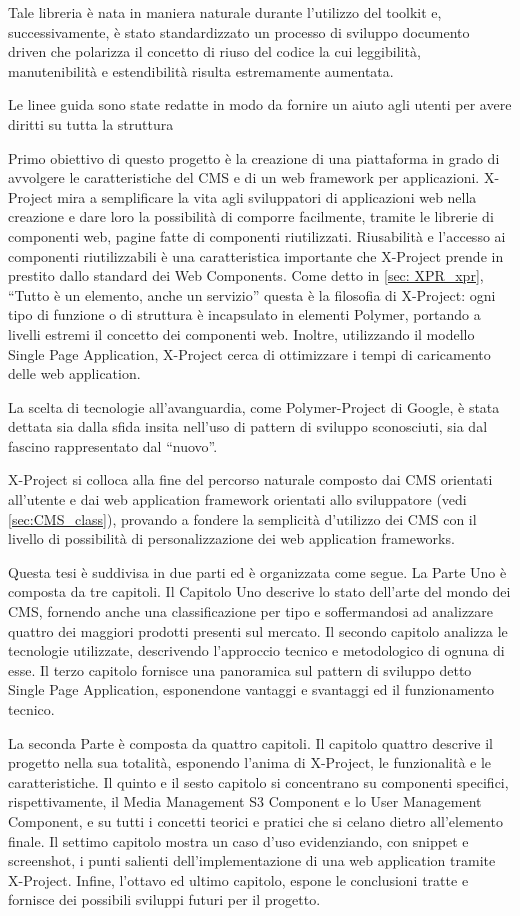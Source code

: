 Tale libreria è nata in maniera naturale durante l'utilizzo del toolkit e, successivamente, è stato standardizzato un processo di sviluppo documento driven che polarizza il concetto di riuso del codice la cui leggibilità, manutenibilità e estendibilità risulta estremamente aumentata.

Le linee guida sono state redatte in modo da fornire un aiuto agli utenti per avere diritti su tutta la struttura

Primo obiettivo di questo progetto è la creazione di una piattaforma in grado di avvolgere le caratteristiche del CMS e di un web framework per applicazioni.
X-Project mira a semplificare la vita agli sviluppatori di applicazioni web nella creazione e dare loro la possibilità di comporre facilmente, tramite le librerie di componenti web, pagine fatte di componenti riutilizzati.
Riusabilità e l'accesso ai componenti riutilizzabili è una caratteristica importante che X-Project prende in prestito dallo standard dei Web Components.
Come detto in \ref{sec: XPR_xpr}, ``Tutto è un elemento, anche un servizio'' questa è la filosofia di X-Project: ogni tipo di funzione o di struttura è incapsulato in elementi Polymer, portando a livelli estremi il concetto dei componenti web.
Inoltre, utilizzando il modello Single Page Application, X-Project cerca di ottimizzare i tempi di caricamento delle web application.

La scelta di tecnologie all'avanguardia, come Polymer-Project di Google, è stata dettata sia dalla sfida insita nell'uso di pattern di sviluppo sconosciuti, sia dal fascino rappresentato dal ``nuovo''. 

X-Project si colloca alla fine del percorso naturale composto dai CMS orientati all'utente e dai web application framework orientati allo sviluppatore (vedi \ref{sec:CMS_class}), provando a fondere la semplicità d'utilizzo dei CMS con il livello di possibilità di personalizzazione dei web application frameworks.

Questa tesi è suddivisa in due parti ed è organizzata come segue. La Parte Uno è composta da tre capitoli. Il Capitolo Uno descrive lo stato dell'arte del mondo dei CMS, fornendo anche una classificazione per tipo e soffermandosi ad analizzare quattro dei maggiori prodotti presenti sul mercato. Il secondo capitolo analizza le tecnologie utilizzate, descrivendo l'approccio tecnico e metodologico di ognuna di esse. Il terzo capitolo fornisce una panoramica sul pattern di sviluppo detto Single Page Application, esponendone vantaggi e svantaggi ed il funzionamento tecnico.

La seconda Parte è composta da quattro capitoli. Il capitolo quattro descrive il progetto nella sua totalità, esponendo l'anima di X-Project, le funzionalità e le caratteristiche.
Il quinto e il sesto capitolo si concentrano su componenti specifici, rispettivamente, il Media Management S3 Component e lo User Management Component, e su tutti i concetti teorici e pratici che si celano dietro all'elemento finale.
Il settimo capitolo mostra un caso d'uso evidenziando, con snippet e screenshot, i punti salienti dell'implementazione di una web application tramite X-Project.
Infine, l'ottavo ed ultimo capitolo, espone le conclusioni tratte e fornisce dei possibili sviluppi futuri per il progetto.